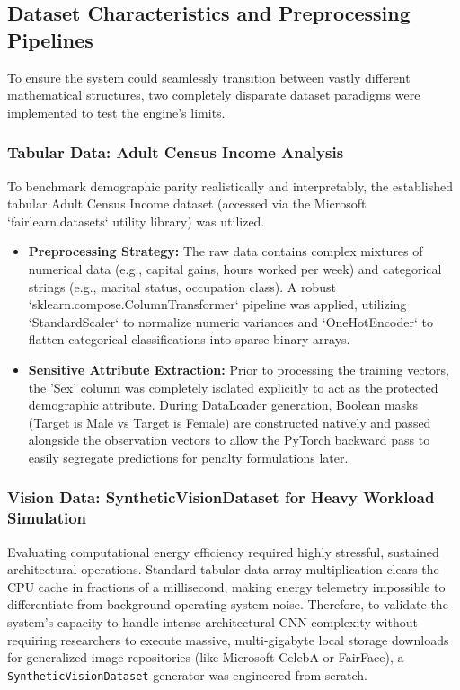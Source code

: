 \documentclass[12pt,a4paper]{article}
\begin{document}
\subsection{Dataset Characteristics and Preprocessing Pipelines}
To ensure the system could seamlessly transition between vastly different mathematical structures, two completely disparate dataset paradigms were implemented to test the engine's limits.

\subsubsection{Tabular Data: Adult Census Income Analysis}
To benchmark demographic parity realistically and interpretably, the established tabular Adult Census Income dataset (accessed via the Microsoft `fairlearn.datasets` utility library) was utilized. 
\begin{itemize}
    \item \textbf{Preprocessing Strategy:} The raw data contains complex mixtures of numerical data (e.g., capital gains, hours worked per week) and categorical strings (e.g., marital status, occupation class). A robust `sklearn.compose.ColumnTransformer` pipeline was applied, utilizing `StandardScaler` to normalize numeric variances and `OneHotEncoder` to flatten categorical classifications into sparse binary arrays.
    \item \textbf{Sensitive Attribute Extraction:} Prior to processing the training vectors, the 'Sex' column was completely isolated explicitly to act as the protected demographic attribute. During DataLoader generation, Boolean masks (Target is Male vs Target is Female) are constructed natively and passed alongside the observation vectors to allow the PyTorch backward pass to easily segregate predictions for penalty formulations later.
\end{itemize}

\subsubsection{Vision Data: SyntheticVisionDataset for Heavy Workload Simulation}
Evaluating computational energy efficiency required highly stressful, sustained architectural operations. Standard tabular data array multiplication clears the CPU cache in fractions of a millisecond, making energy telemetry impossible to differentiate from background operating system noise. Therefore, to validate the system's capacity to handle intense architectural CNN complexity without requiring researchers to execute massive, multi-gigabyte local storage downloads for generalized image repositories (like Microsoft CelebA or FairFace), a \texttt{SyntheticVisionDataset} generator was engineered from scratch. 
\end{document}
